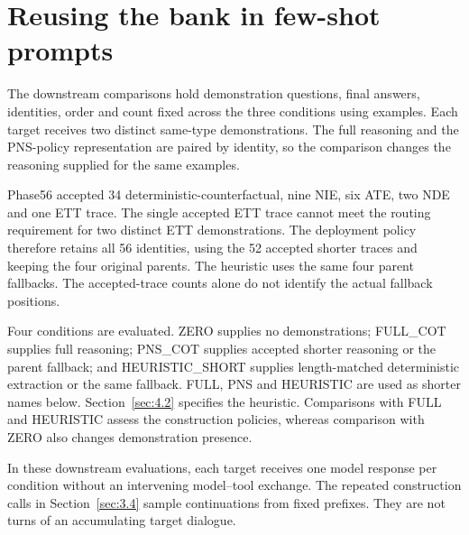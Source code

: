 \section{Reusing the bank in few-shot prompts}\label{sec:3.6}

The downstream comparisons hold demonstration questions, final answers, identities, order and count fixed across the three conditions using examples. Each target receives two distinct same-type demonstrations. The full reasoning and the PNS-policy representation are paired by identity, so the comparison changes the reasoning supplied for the same examples.

Phase56 accepted 34 deterministic-counterfactual, nine NIE, six ATE, two NDE and one ETT trace. The single accepted ETT trace cannot meet the routing requirement for two distinct ETT demonstrations. The deployment policy therefore retains all 56 identities, using the 52 accepted shorter traces and keeping the four original parents. The heuristic uses the same four parent fallbacks. The accepted-trace counts alone do not identify the actual fallback positions.

Four conditions are evaluated. ZERO supplies no demonstrations; FULL\_COT supplies full reasoning; PNS\_COT supplies accepted shorter reasoning or the parent fallback; and HEURISTIC\_SHORT supplies length-matched deterministic extraction or the same fallback. FULL, PNS and HEURISTIC are used as shorter names below. Section~\ref{sec:4.2} specifies the heuristic. Comparisons with FULL and HEURISTIC assess the construction policies, whereas comparison with ZERO also changes demonstration presence.

In these downstream evaluations, each target receives one model response per condition without an intervening model--tool exchange. The repeated construction calls in Section~\ref{sec:3.4} sample continuations from fixed prefixes. They are not turns of an accumulating target dialogue.
